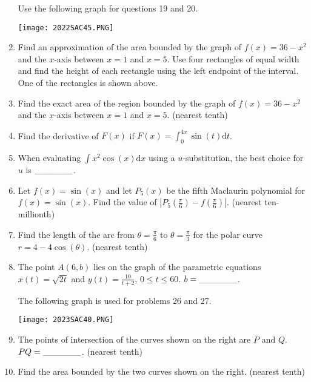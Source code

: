 \documentclass[../uilmath.tex]{subfiles}
\begin{document}
\begin{enumerate}[label=\bfseries\arabic*.]
    Use the following graph for questions 19 and 20.
    \begin{center}
        \texttt{[image: 2022SAC45.PNG]}
    \end{center}
    \item %
    Find an approximation of the area bounded by the graph of $f(x)=36-x^2$ and the $x$-axis between $x=1$ and $x=5$. 
    Use four rectangles of equal width and find the height of each rectangle using the left endpoint of the interval. One of the rectangles is shown above.

    \item %
    Find the exact area of the region bounded by the graph of $f(x)=36-x^2$ and the $x$-axis between $x=1$ and $x=5$. (nearest tenth)

    \item %
    Find the derivative of $F(x)$ if $F(x)=\int_0^{4x}\sin(t)\mathrm{d}t$.

    \item %
    When evaluating $\int x^2\cos(x)\mathrm{d}x$ using a $u$-substitution, the best choice for $u$ is $\_\_\_\_\_\_$.

    \item %
    Let $f(x)=\sin(x)$ and let $P_5(x)$ be the fifth Maclaurin polynomial for $f(x)=\sin(x)$. Find the value of 
    $\left|P_5\left(\frac{\pi}{6}\right)-f\left(\frac{\pi}{6}\right)\right|$. (nearest ten-millionth)

    \item %
    Find the length of the arc from $\theta=\frac{\pi}{6}$ to $\theta=\frac{\pi}{3}$ for the polar curve $r=4-4\cos(\theta)$. (nearest tenth)

    \item %
    The point $A(6,b)$ lies on the graph of the parametric equations $x(t)=\sqrt{2t}$ and $y(t)=\frac{10}{t+2}$, $0\leq t\leq 60$.
    $b=\_\_\_\_\_\_$.


    The following graph is used for problems 26 and 27.
    \begin{center}
        \texttt{[image: 2023SAC40.PNG]}
    \end{center}
    \item %
    The points of intersection of the curves shown on the right are $P$ and $Q$. $PQ=\_\_\_\_\_\_$. (nearest tenth)

    \item %
    Find the area bounded by the two curves shown on the right. (nearest tenth)


\end{enumerate}
\end{document}
